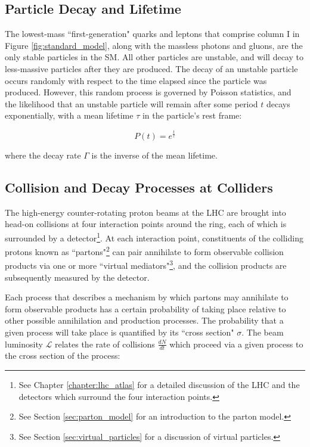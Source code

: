 \subsection{Particle Decay and Lifetime}

The lowest-mass ``first-generation" quarks and leptons that comprise column I in Figure \ref{fig:standard_model}, along with the massless photons and gluons, are the only stable particles in the SM. All other particles are unstable, and will decay to less-massive particles after they are produced. The decay of an unstable particle occurs randomly with respect to the time elapsed since the particle was produced. However, this random process is governed by Poisson statistics, and the likelihood that an unstable particle will remain after some period \(t\) decays exponentially, with a mean lifetime \(\tau\) in the particle's rest frame:

\begin{equation}
\label{eq:particle_decay}
P(t) = e^{\frac{t}{\tau}}
\end{equation}

\noindent where the decay rate \(\Gamma\) is the inverse of the mean lifetime.  

\subsection{Collision and Decay Processes at Colliders}
\label{sec:col_decay_procs}

The high-energy counter-rotating proton beams at the LHC are brought into head-on collisions at four interaction points around the ring, each of which is surrounded by a detector\footnote{See Chapter \ref{chapter:lhc_atlas} for a detailed discussion of the LHC and the detectors which surround the four interaction points.}. At each interaction point, constituents of the colliding protons known as ``partons"\footnote{See Section \ref{sec:parton_model} for an introduction to the parton model.} can pair annihilate to form observable collision products via one or more ``virtual mediators"\footnote{See Section \ref{sec:virtual_particles} for a discussion of virtual particles.}, and the collision products are subsequently measured by the detector. 

Each process that describes a mechanism by which partons may annihilate to form observable products has a certain probability of taking place relative to other possible annihilation and production processes. The probability that a given process will take place is quantified by its ``cross section" \(\sigma\). The beam luminosity \(\mathcal{L}\) relates the rate of collisions \(\frac{dN}{dt}\) which proceed via a given process to the cross section of the process:

